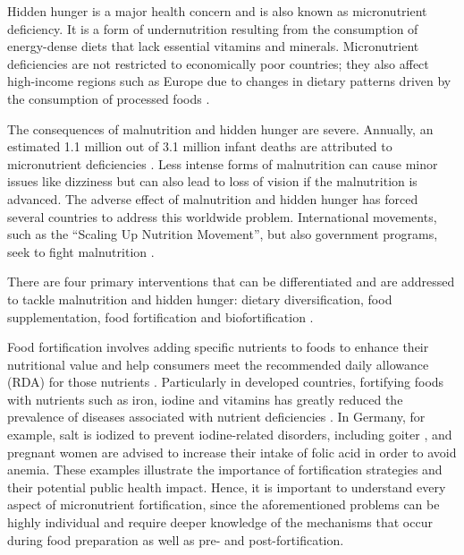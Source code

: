 Hidden hunger is a major health concern and is also known as micronutrient deficiency. It is a form of undernutrition resulting from the consumption of energy-dense diets that lack essential vitamins and minerals. Micronutrient deficiencies are not restricted to economically poor countries; they also affect high-income regions such as Europe due to changes in dietary patterns driven by the consumption of processed foods \autocite{1ofori}. \par

The consequences of malnutrition and hidden hunger are severe. Annually, an estimated 1.1 million out of 3.1 million infant deaths are attributed to micronutrient deficiencies \autocites{2c}{largescale}. Less intense forms of malnutrition can cause minor issues like dizziness but can also lead to loss of vision if the malnutrition is advanced. The adverse effect of malnutrition and hidden hunger has forced several countries to address this worldwide problem. International movements, such as the “Scaling Up Nutrition Movement”, but also government programs, seek to fight malnutrition \autocites{4hidden}{5unnes}.  \par

There are four primary interventions that can be differentiated and are addressed to tackle malnutrition and hidden hunger: dietary diversification, food supplementation, food fortification and biofortification \autocites{6biofort}{7plants}. \par

Food fortification involves adding specific nutrients to foods to enhance their nutritional value and help consumers meet the recommended daily allowance (RDA) for those nutrients \autocite{6biofort}. Particularly in developed countries, fortifying foods with nutrients such as iron, iodine and vitamins has greatly reduced the prevalence of diseases associated with nutrient deficiencies \autocite{8forti}. In Germany, for example, salt is iodized to prevent iodine-related disorders, including goiter \autocite{iodine}, and pregnant women are advised to increase their intake of folic acid in order to avoid anemia. These examples illustrate the importance of fortification strategies and their potential public health impact. Hence, it is important to understand every aspect of micronutrient fortification, since the aforementioned problems can be highly individual and require deeper knowledge of the mechanisms that occur during food preparation as well as pre- and post-fortification. \par

